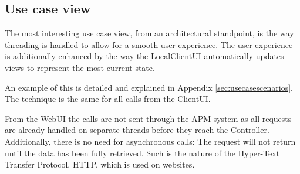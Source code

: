 \subsection{Use case view}

The most interesting use case view, from an architectural standpoint, is the way threading is handled
to allow for a smooth user-experience. The user-experience is additionally enhanced by the way the
LocalClientUI automatically updates views to represent the most current state.

An example of this is detailed and explained in Appendix \ref{sec:usecasescenarios}. The technique
is the same for all calls from the ClientUI.

From the WebUI the calls are not sent through the APM system as all requests are already handled on
separate threads before they reach the Controller. Additionally, there is no need for asynchronous calls:
The request will not return until the data has been fully retrieved. Such is the nature of the Hyper-Text
Transfer Protocol, HTTP, which is used on websites.
